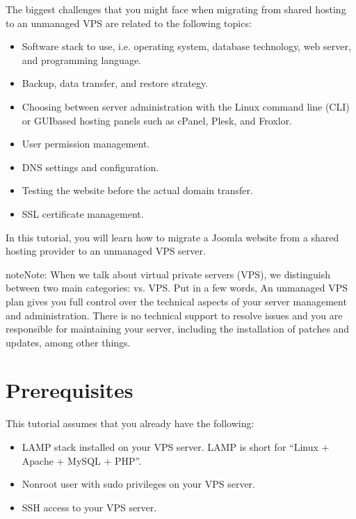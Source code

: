 \documentclass[a4paper,10pt,english,openany,oneside]{sphinxmanual}
\begin{document}
\sphinxAtStartPar
The biggest challenges that you might face when migrating from shared hosting to an unmanaged VPS are related to the following topics:
\begin{itemize}
\item {} 
\sphinxAtStartPar
Software stack to use, i.e. operating system, database technology, web server, and programming language.

\item {} 
\sphinxAtStartPar
Backup, data transfer, and restore strategy.

\item {} 
\sphinxAtStartPar
Choosing between server administration with the Linux command line (CLI) or GUI\sphinxhyphen{}based hosting panels such as cPanel, Plesk, and Froxlor.

\item {} 
\sphinxAtStartPar
User permission management.

\item {} 
\sphinxAtStartPar
DNS settings and configuration.

\item {} 
\sphinxAtStartPar
Testing the website before the actual domain transfer.

\item {} 
\sphinxAtStartPar
SSL certificate management.

\end{itemize}

\sphinxAtStartPar
In this tutorial, you will learn how to migrate a Joomla website from a shared hosting provider to an unmanaged VPS server.

\begin{sphinxadmonition}{note}{Note:}
\sphinxAtStartPar
When we talk about virtual private servers (VPS), we distinguish between two main categories:  vs.  VPS. Put in a few words, An unmanaged VPS plan gives you full control over the technical aspects of your server management and administration. There is no technical support to resolve issues and you are responsible for maintaining your server, including the installation of patches and updates, among other things.
\end{sphinxadmonition}


\section{Prerequisites}
\label{\detokenize{joomla-to-vps:prerequisites}}\label{\detokenize{joomla-to-vps:requirements}}
\sphinxAtStartPar
This tutorial assumes that you already have the following:
\begin{itemize}
\item {} 
\sphinxAtStartPar
LAMP stack installed on your VPS server. LAMP is short for “Linux + Apache + MySQL + PHP”.

\item {} 
\sphinxAtStartPar
Non\sphinxhyphen{}root user with sudo privileges on your VPS server.

\item {} 
\sphinxAtStartPar
SSH access to your VPS server.

\end{itemize}
\end{document}
